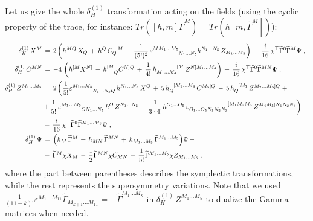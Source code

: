 \documentclass[a4paper,11pt]{article}
\begin{document}
Let us give the whole $\delta^{(1)}_H$ transformation acting
on the fields (using the cyclic property of the trace, for instance: 
$Tr([h,m]\widetilde{\Gamma}^{M})= Tr(h[m,\widetilde{\Gamma}^{M}])$):
\begin{align*}
\delta^{(1)}_H\,X^M
&\,=\, 
2\left( h^{MQ}\,X_Q\,+\,h^{Q}\,C_Q^{\phantom{N}M}\,-\,
\frac{1}{(5!)^2}\,\varepsilon^{M M_1\ldots M_5}_{\phantom{M M_1\ldots M_5}N_1\ldots N_5}h^{N_1\ldots N_5}\,
Z_{M_1\ldots M_5} \right)
\,-\,\frac{i}{16}\,\chi^{\top}\widetilde{\Gamma}^0
\widetilde{\Gamma}^{M}\Psi
\;,\\
\delta^{(1)}_H\,C^{MN}
&\,=\, 
-4\,\left(h^{[M} X^{N]}\,-\,h^{[M}_{\phantom{[M}Q}C^{N]Q}
\,+\, \frac{1}{4!}\,h_{M_1\ldots M_4}^{\phantom{M_1\ldots M_4}[M}\,Z^{N] M_1\ldots M_4}
\right)\,+\,\frac{i}{16}\,\chi^{\top}\widetilde{\Gamma}^0 \widetilde{\Gamma}^{MN}\Psi\;,\\
\delta^{(1)}_H\,Z^{M_1\ldots M_5}
&\,=\,2 \left( \frac{1}{5!}
\varepsilon_{\phantom{M_1\ldots M_5}N_1\ldots N_5 Q}^{M_1\ldots M_5}\,h^{N_1\ldots N_5}\,X^{Q}
\,+\,5\,h_Q^{\phantom{Q}[M_1\ldots M_4}\,
C^{M_5]Q}\,-\,
5\,h_Q^{\phantom{Q}[M_1}\,Z^{M_2\ldots M_5]Q}\right.+\\
&\left.+\,\frac{1}{5!}\,\varepsilon^{M_1\ldots M_5}_{\phantom{M_1\ldots M_5}O 
N_1\ldots N_5}\,h^O\,Z^{N_1\ldots N_5}-\, \frac{1}{3\cdot4!} h^{O_1 \ldots O_5}\, \varepsilon_{O_1 \ldots O_5 N_1 N_2 N_3}^{\phantom{O_1\ldots O_5 N_1 N_2 N_3}[M_1 M_2 M_3}
\,Z^{M_4 M_5]N_1 N_2 N_3}\right)\,-\\
&\,-\,\frac{i}{16}\,\chi^{\top}\widetilde{\Gamma}^0
\widetilde{\Gamma}^{M_1 \ldots M_5}\Psi\;, \\
\delta^{(1)}_H\,\Psi &\,=\, \Big(h_M\,\widetilde{\Gamma}^M \,+\,h_{MN}\,\widetilde{\Gamma}^{MN}
\,+\,h_{M_1\ldots M_5}\,\widetilde{\Gamma}^{M_1\ldots M_5}\Big) \Psi\,-\notag\\
&\,-\,\widetilde{\Gamma}^{M} \chi X_M
\,-\,\frac{1}{2}\widetilde{\Gamma}^{MN} \chi C_{MN} 
\,-\,\frac{1}{5!}\widetilde{\Gamma}^{M_1\ldots
M_5} \chi Z_{M_1 \ldots M_5}\:,
\end{align*}
where the part between parentheses describes the symplectic transformations, while the rest represents
the supersymmetry variations.
Note that we used $\frac{1}{(11-k)!} \varepsilon^{M_1 \ldots M_{11}} \tilde{\Gamma}_{M_{k+1} \ldots 
M_{11}} = - \tilde{\Gamma}^{M_1 \ldots M_k}$ in $\delta^{(1)}_H\,Z^{M_1\ldots M_5}$ to dualize the 
Gamma matrices when needed.
\end{document}
